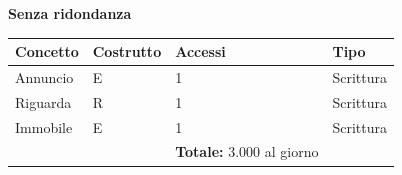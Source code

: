 \documentclass[a4paper,12pt]{report}
\begin{document}
            \begin{center}
                \textbf{Senza ridondanza}
            \end{center}
            \begin{table}[H]
            \centering
            \begin{tabular}{llll}
            \rowcolor{green!20} \textbf{Concetto} & \textbf{Costrutto} & \textbf{Accessi} & \textbf{Tipo} \\ [0.5ex] 
            \hline
            Annuncio & E & 1 & Scrittura \\ 
            Riguarda & R & 1 & Scrittura \\ 
            Immobile & E & 1 & Scrittura \\ 
            \hline
            \rowcolor{green!20}  &   & \textbf{Totale:}  3.000 al giorno &  \\ [1ex] 
            \end{tabular}
            \end{table}
        	
\end{document}

